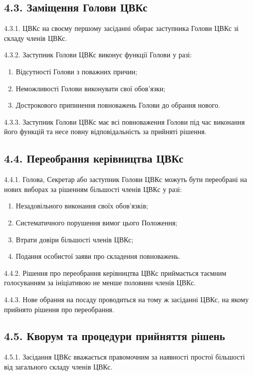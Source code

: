 \subsection*{4.3. Заміщення Голови ЦВКс}
    4.3.1. ЦВКс на своєму першому засіданні обирає заступника Голови ЦВКс зі складу членів ЦВКс.

    4.3.2. Заступник Голови ЦВКс виконує функції Голови у разі:

        \begin{enumerate}[label=\alph*)]
            \item Відсутності Голови з поважних причин;
            \item Неможливості Голови виконувати свої обов'язки;
            \item Дострокового припинення повноважень Голови до обрання нового.
        \end{enumerate}

    4.3.3. Заступник Голови ЦВКс має всі повноваження Голови під час виконання його функцій та несе повну відповідальність за прийняті рішення.

\subsection*{4.4. Переобрання керівництва ЦВКс}
    4.4.1. Голова, Секретар або заступник Голови ЦВКс можуть бути переобрані на нових виборах за рішенням більшості членів ЦВКс у разі:

        \begin{enumerate}[label=\alph*)]
            \item Незадовільного виконання своїх обов'язків;
            \item Систематичного порушення вимог цього Положення;
            \item Втрати довіри більшості членів ЦВКс;
            \item Подання особистої заяви про складення повноважень.
        \end{enumerate}

    4.4.2. Рішення про переобрання керівництва ЦВКс приймається таємним голосуванням за ініціативою не менше половини членів ЦВКс.

    4.4.3. Нове обрання на посаду проводиться на тому ж засіданні ЦВКс, на якому прийнято рішення про переобрання.

\subsection*{4.5. Кворум та процедури прийняття рішень}
    4.5.1. Засідання ЦВКс вважається правомочним за наявності простої більшості від загального складу членів ЦВКс.

